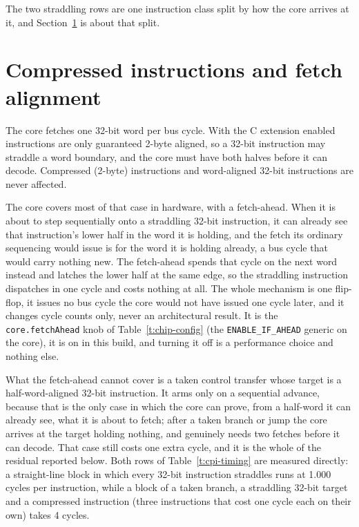 \documentclass[11pt,pdftex,openany,letterpaper]{report}
\begin{document}
The two straddling rows are one instruction class split by how the core arrives at it, and Section~\ref{ss:cpi-align} is about that split.

\section{Compressed instructions and fetch alignment} \label{ss:cpi-align}

The core fetches one 32-bit word per bus cycle. With the C extension enabled instructions are only guaranteed 2-byte aligned, so a 32-bit instruction may straddle a word boundary, and the core must have both halves before it can decode. Compressed (2-byte) instructions and word-aligned 32-bit instructions are never affected.

The core covers most of that case in hardware, with a fetch-ahead. When it is about to step sequentially onto a straddling 32-bit instruction, it can already see that instruction's lower half in the word it is holding, and the fetch its ordinary sequencing would issue is for the word it is holding already, a bus cycle that would carry nothing new. The fetch-ahead spends that cycle on the next word instead and latches the lower half at the same edge, so the straddling instruction dispatches in one cycle and costs nothing at all. The whole mechanism is one flip-flop, it issues no bus cycle the core would not have issued one cycle later, and it changes cycle counts only, never an architectural result. It is the \texttt{core.fetchAhead} knob of Table~\ref{t:chip-config} (the \texttt{ENABLE\_IF\_AHEAD} generic on the core), it is on in this build, and turning it off is a performance choice and nothing else.

What the fetch-ahead cannot cover is a taken control transfer whose target is a half-word-aligned 32-bit instruction. It arms only on a sequential advance, because that is the only case in which the core can prove, from a half-word it can already see, what it is about to fetch; after a taken branch or jump the core arrives at the target holding nothing, and genuinely needs two fetches before it can decode. That case still costs one extra cycle, and it is the whole of the residual reported below. Both rows of Table~\ref{t:cpi-timing} are measured directly: a straight-line block in which every 32-bit instruction straddles runs at 1.000 cycles per instruction, while a block of a taken branch, a straddling 32-bit target and a compressed instruction (three instructions that cost one cycle each on their own) takes 4 cycles.
\end{document}
